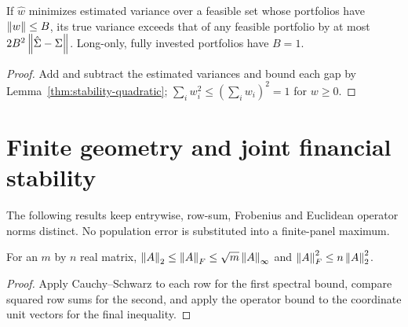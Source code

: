 \begin{theorem}\label{thm:stability-portfolio}
  \leanok
  If $\hat w$ minimizes estimated variance over a feasible set whose portfolios
  have $\left\lVert w\right\rVert\le B$, its true variance exceeds that of any feasible portfolio
  by at most $2B^2\left\lVert\hat\Sigma-\Sigma\right\rVert$. Long-only, fully invested
  portfolios have $B=1$.
\end{theorem}
\begin{proof}\leanok
  Add and subtract the estimated variances and bound each gap by
  Lemma~\ref{thm:stability-quadratic}; $\sum_iw_i^2\le(\sum_iw_i)^2=1$ for
  $w\ge0$.
\end{proof}

\section{Finite geometry and joint financial
stability}\label{sec:bp-extension-geometry}

The following results keep entrywise, row-sum, Frobenius and Euclidean operator
norms distinct. No population error is substituted into a finite-panel maximum.

\begin{lemma}\label{thm:matrix-norm-bridge}
  \leanok
  For an $m$ by $n$ real matrix,
  $\left\lVert A\right\rVert_2\le\left\lVert A\right\rVert_F\le\sqrt m\left\lVert A\right\rVert_\infty$ and
  $\left\lVert A\right\rVert_F^2\le n\left\lVert A\right\rVert_2^2$.
\end{lemma}
\begin{proof}\leanok
  Apply Cauchy--Schwarz to each row for the first spectral bound, compare
  squared row sums for the second, and apply the operator bound to the
  coordinate unit vectors for the final inequality.
\end{proof}

